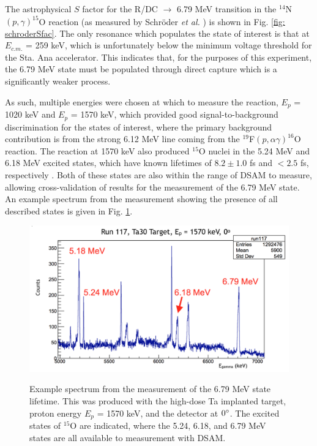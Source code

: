 The astrophysical $S$ factor for the R/DC $\rightarrow$ 6.79 MeV transition in the $^{14}$N$\left( p,\gamma \right) ^{15}$O reaction (as measured by Schr{\"o}der \textit{et al.} \cite{Schroder1987}) is shown in Fig. \ref{fig: schroderSfac}. The only resonance which populates the state of interest is that at  $E_{c.m.}$ = 259 keV, which is unfortunately below the minimum voltage threshold for the Sta. Ana accelerator. This indicates that, for the purposes of this experiment, the 6.79 MeV state must be populated through direct capture which is a significantly weaker process. 

As such, multiple energies were chosen at which to measure the reaction, $E_{p}$ = 1020 keV and $E_{p}$ = 1570 keV, which provided good signal-to-background discrimination for the states of interest, where the primary background contribution is from the strong 6.12 MeV line coming from the $^{19}$F$\left( p, \alpha\gamma \right)^{16}$O reaction. The reaction at 1570 keV also produced $^{15}$O nuclei in the 5.24 MeV and 6.18 MeV excited states, which have known lifetimes of $8.2 \pm 1.0$ fs and $< 2.5$ fs, respectively \cite{Ajzenberg-Selove1991}. Both of these states are also within the range of DSAM to measure, allowing cross-validation of results for the measurement of the 6.79 MeV state. An example spectrum from the measurement showing the presence of all described states is given in Fig. \ref{fig: lifetimeSpec}.


\begin{figure}
\includegraphics[width=\linewidth]{figures/lifetimeSpectrum.png}
\label{fig: lifetimeSpec}
\caption{Example spectrum from the measurement of the 6.79 MeV state lifetime. This was produced with the high-dose Ta implanted target, proton energy $E_{p}$ = 1570 keV, and the detector at $0\degree$. The excited states of $^{15}$O are indicated, where the 5.24, 6.18, and 6.79 MeV states are all available to measurement with DSAM.  }
\end{figure}

